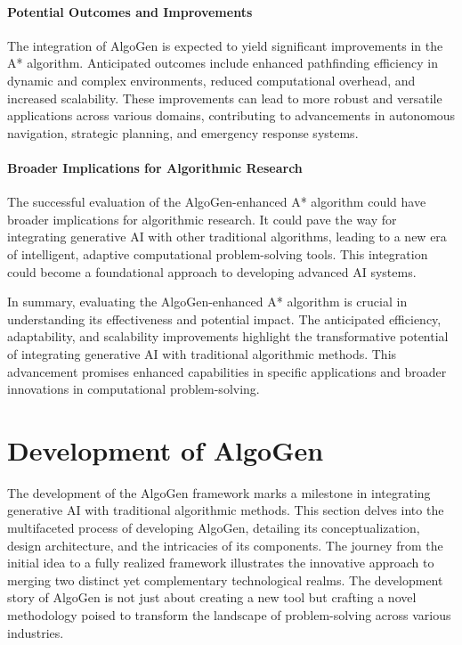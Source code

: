 \documentclass{article}
\begin{document}
\paragraph{Potential Outcomes and Improvements}
The integration of AlgoGen is expected to yield significant improvements in the A* algorithm. Anticipated outcomes include enhanced pathfinding efficiency in dynamic and complex environments, reduced computational overhead, and increased scalability. These improvements can lead to more robust and versatile applications across various domains, contributing to advancements in autonomous navigation, strategic planning, and emergency response systems.

\paragraph{Broader Implications for Algorithmic Research}
The successful evaluation of the AlgoGen-enhanced A* algorithm could have broader implications for algorithmic research. It could pave the way for integrating generative AI with other traditional algorithms, leading to a new era of intelligent, adaptive computational problem-solving tools. This integration could become a foundational approach to developing advanced AI systems.

In summary, evaluating the AlgoGen-enhanced A* algorithm is crucial in understanding its effectiveness and potential impact. The anticipated efficiency, adaptability, and scalability improvements highlight the transformative potential of integrating generative AI with traditional algorithmic methods. This advancement promises enhanced capabilities in specific applications and broader innovations in computational problem-solving.




\section{Development of AlgoGen}

The development of the AlgoGen framework marks a milestone in integrating generative AI with traditional algorithmic methods. This section delves into the multifaceted process of developing AlgoGen, detailing its conceptualization, design architecture, and the intricacies of its components. The journey from the initial idea to a fully realized framework illustrates the innovative approach to merging two distinct yet complementary technological realms. The development story of AlgoGen is not just about creating a new tool but crafting a novel methodology poised to transform the landscape of problem-solving across various industries.
\end{document}
